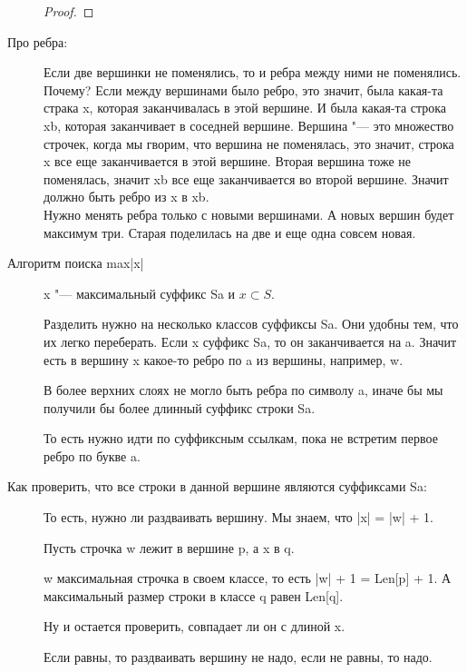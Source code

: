 \begin{description}
\begin{proof}
    \end{proof}
 
    \item[Про ребра:]
    Если две вершинки не поменялись, то и ребра между ними не поменялись.
    \\
    Почему? Если между вершинами было ребро, это значит, была какая-та страка x, которая заканчивалась в этой вершине. 
    И была какая-та строка xb, которая заканчивает в соседней вершине. Вершина "--- это множество строчек, 
    когда мы гворим, что вершина не поменялась, это значит, строка x все еще заканчивается в этой вершине. Вторая 
    вершина тоже не поменялась, значит xb все еще заканчивается во второй вершине. Значит должно быть ребро из x в xb.
    \\
    Нужно менять ребра только с новыми вершинами. А новых вершин будет
    максимум три. Старая поделилась на две и еще одна совсем новая.
    \\  
    \item[Алгоритм поиска max|x|]
    x "--- максимальный суффикс Sa и $x \subset S$.

   
    Разделить нужно на несколько классов суффиксы Sa. Они удобны тем, что их легко переберать.
    Если x суффикс Sa, то он заканчивается на a. Значит есть в вершину x какое-то ребро по a из вершины,
    например, w.
                                                   
    В более верхних слоях не могло быть ребра по символу a, иначе бы мы получили бы более длинный суффикс 
    строки Sa.

    То есть нужно идти по суффиксным ссылкам, пока не встретим первое ребро по букве a.

    \item[Как проверить, что все строки в данной вершине являются суффиксами Sa:]
    То есть, нужно ли раздваивать вершину. Мы знаем, что |x| = |w| + 1.

    Пусть строчка w лежит в вершине p, а x в q. 

    w максимальная строчка в своем классе, то есть |w| + 1 = Len[p] + 1.
    А максимальный размер строки в классе q равен Len[q]. 

    Ну и остается проверить, совпадает ли он с длиной x.
    
    Если равны, то раздваивать вершину не надо, если не равны, то надо.


    \end{description}
